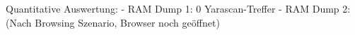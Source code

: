 Quantitative Auswertung:
	- RAM Dump 1: 0 Yarascan-Treffer
	- RAM Dump 2: (Nach Browsing Szenario, Browser noch geöffnet)
		\captionsetup[subfigure]{labelformat=empty}
		\begin{figure}[h!]
			\small
			\centering	
			\hspace*{\fill}
\end{figure}
